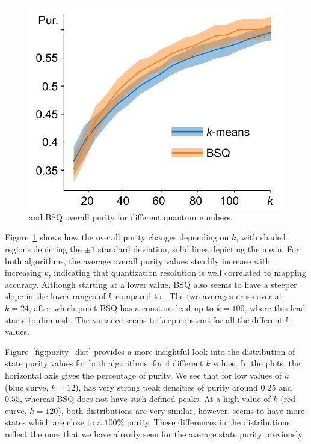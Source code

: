 			\begin{figure}[ht]
				\centering
				\includegraphics[width=0.5\linewidth]{figures/04_ema/purity_overall/purity_overall_framed.pdf}
				\caption[\kmeans{} and BSQ overall purity]{\kmeans{} and BSQ overall purity for different quantum numbers. }
				\label{fig:purity_overall}
			\end{figure}
		
			Figure~\ref{fig:purity_overall} shows how the overall purity changes depending on $k$, with shaded regions depicting the $\pm1$ standard deviation, solid lines depicting the mean.
			For both algorithms, the average overall purity values steadily increase with increasing $k$, indicating that quantization resolution is well correlated to mapping accuracy.
			Although starting at a lower value, \ac{BSQ} also seems to have a steeper slope in the lower ranges of $k$ compared to \kmeans{}.
			The two averages cross over at $k=24$, after which point \ac{BSQ} has a constant lead up to $k=100$, where this lead starts to diminish.
			The variance seems to keep constant for all the different $k$ values.
			
			Figure~\ref{fig:purity_dist} provides a more insightful look into the distribution of state purity values for both algorithms, for $4$ different $k$ values.
			In the plots, the horizontal axis gives the percentage of purity. We see that for low values of $k$ (blue curve, $k=12$), \kmeans{} has very strong peak densities of purity around $0.25$ and $0.55$, whereas \ac{BSQ} does not have such defined peaks.
			At a high value of $k$ (red curve, $k=120$), both distributions are very similar, however, \kmeans{} seems to have more states which are close to a $100\%$ purity.
			These differences in the distributions reflect the ones that we have already seen for the average state purity previously.
			
